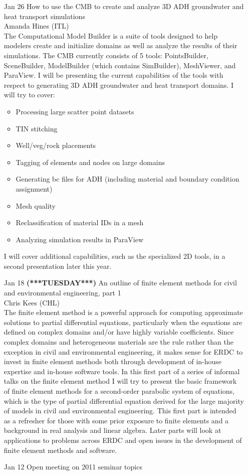 \documentclass[12]{article}
\begin{document}
\begin{enumerate}
\item[Jan 26] How to use the CMB to create and analyze 3D ADH
  groundwater and heat transport simulations\\Amanda Hines (ITL)\\ The
  Computational Model Builder is a suite of tools designed to help
  modelers create and initialize domains as well as analyze the
  results of their simulations. The CMB currently consists of 5 tools:
  PointsBuilder, SceneBuilder, ModelBuilder (which contains
  SimBuilder), MeshViewer, and ParaView. I will be presenting the
  current capabilities of the tools with respect to generating 3D ADH
  groundwater and heat transport domains. I will try to cover:
\begin{itemize}
\item Processing large scatter point datasets
\item TIN stitching
\item Well/veg/rock placements
\item Tagging of elements and nodes on large domains
\item Generating bc files for ADH (including material and boundary condition assignment)
\item Mesh quality
\item Reclassification of material IDs in a mesh
\item Analyzing simulation results in ParaView 
\end{itemize}
I will cover additional capabilities, such as the specialized 2D
tools, in a second presentation later this year.

\item[Jan 18 {\bf (***TUESDAY***)}] An outline of finite element methods for civil and
  environmental engineering, part 1\\ Chris Kees (CHL) \\ 
The finite element method is a powerful approach for computing
approximate solutions to partial differential equations, particularly
when the equations are defined on complex domains and/or have highly
variable coefficients. Since complex domains and heterogeneous
materials are the rule rather than the exception in civil and
environmental engineering, it makes sense for ERDC to invest in finite
element methods both through development of in-house expertise and in-house
software tools. In this first part of a series of informal talks on
the finite element method I will try to present the basic framework of
finite element methods for a second-order parabolic system of equations, which is
the type of partial differential equation derived for the large
majority of models in civil and environmental engineering. This first
part is intended as a refresher for those with some prior exposure
to finite elements and a background in real analysis and linear
algebra. Later parts will look at applications to problems across ERDC
and open issues in the development of finite element methods and
software.

\item[Jan 12] Open meeting on 2011 seminar topics

\end{enumerate}
\end{document}
